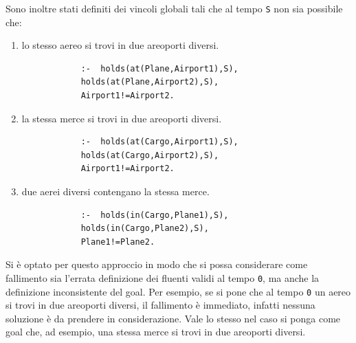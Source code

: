 \documentclass[a4paper,oneside,12pt]{book}
\begin{document}
    Sono inoltre stati definiti dei vincoli globali tali che al tempo \texttt{S} non sia possibile che:
    \begin{enumerate}
        \item lo stesso aereo si trovi in due areoporti diversi. \label{itm:p_at}
        \begin{verbatim}
            :-  holds(at(Plane,Airport1),S),
            holds(at(Plane,Airport2),S),
            Airport1!=Airport2.
        \end{verbatim}
        \item la stessa merce si trovi in due areoporti diversi. \label{itm:c_at}
        \begin{verbatim}
            :-  holds(at(Cargo,Airport1),S),
            holds(at(Cargo,Airport2),S),
            Airport1!=Airport2.
        \end{verbatim}
        \item due aerei diversi contengano la stessa merce. \label{itm:c_in}
        \begin{verbatim}
            :-  holds(in(Cargo,Plane1),S),
            holds(in(Cargo,Plane2),S),
            Plane1!=Plane2.
        \end{verbatim}
    \end{enumerate}
    Si è optato per questo approccio in modo che si possa considerare come fallimento sia
    l'errata definizione dei fluenti validi al tempo \texttt{0}, ma anche la definizione inconsistente del goal.
    Per esempio, se si pone che al tempo \texttt{0} un aereo si trovi in due areoporti diversi, il fallimento è
    immediato, infatti nessuna soluzione è da prendere in considerazione.
    Vale lo stesso nel caso si ponga come goal che, ad esempio, una stessa merce si trovi in due areoporti diversi.
\end{document}
